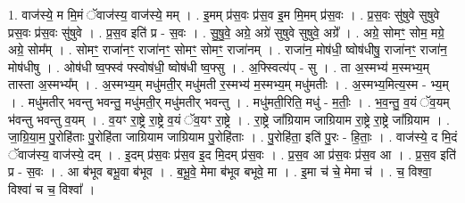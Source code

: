 \documentclass[17pt]{extarticle}
\begin{document}
1. वाज॑स्ये॒ म मि॒मं ॅवाज॑स्य॒ वाज॑स्ये॒ मम् । . इ॒मम् प्र॑स॒वः प्र॑स॒व इ॒म मि॒मम् प्र॑स॒वः । . प्र॒स॒वः सु॑षुवे सुषुवे प्रस॒वः प्र॑स॒वः सु॑षुवे । . प्र॒स॒व इति॑ प्र - स॒वः । . सु॒षु॒वे॒ अग्रे॒ अग्रे॑ सुषुवे सुषुवे॒ अग्रे᳚ । . अग्रे॒ सोमꣳ॒॒ सोम॒ मग्रे॒ अग्रे॒ सोम᳚म् । . सोमꣳ॒॒ राजा॑नꣳ॒॒ राजा॑नꣳ॒॒ सोमꣳ॒॒ सोमꣳ॒॒ राजा॑नम् । . राजा॑न॒ मोष॑धी॒ ष्वोष॑धीषु॒ राजा॑नꣳ॒॒ राजा॑न॒ मोष॑धीषु । . ओष॑धी ष्व॒फ्स्व॑ फ्स्वोष॑धी॒ ष्वोष॑धी ष्व॒फ्सु । . अ॒फ्स्वित्य॑प् - सु । . ता अ॒स्मभ्य॑ म॒स्मभ्य॒म् तास्ता अ॒स्मभ्य᳚म् । . अ॒स्मभ्य॒म् मधु॑मती॒र् मधु॑मती र॒स्मभ्य॑ म॒स्मभ्य॒म् मधु॑मतीः । . अ॒स्मभ्य॒मित्य॒स्म - भ्य॒म् । . मधु॑मतीर् भवन्तु भवन्तु॒ मधु॑मती॒र् मधु॑मतीर् भवन्तु । . मधु॑मती॒रिति॒ मधु॑ - म॒तीः॒ । . भ॒व॒न्तु॒ व॒यं ॅव॒यम् भ॑वन्तु भवन्तु व॒यम् । . व॒यꣳ रा॒ष्ट्रे रा॒ष्ट्रे व॒यं ॅव॒यꣳ रा॒ष्ट्रे । . रा॒ष्ट्रे जा᳚ग्रियाम जाग्रियाम रा॒ष्ट्रे रा॒ष्ट्रे जा᳚ग्रियाम । . जा॒ग्रि॒या॒म॒ पु॒रोहि॑ताः पु॒रोहि॑ता जाग्रियाम जाग्रियाम पु॒रोहि॑ताः । . पु॒रोहि॑ता॒ इति॑ पु॒रः - हि॒ताः॒ । . वाज॑स्ये॒ द मि॒दं ॅवाज॑स्य॒ वाज॑स्ये॒ दम् । . इ॒दम् प्र॑स॒वः प्र॑स॒व इ॒द मि॒दम् प्र॑स॒वः । . प्र॒स॒व आ प्र॑स॒वः प्र॑स॒व आ । . प्र॒स॒व इति॑ प्र - स॒वः । . आ ब॑भूव बभू॒वा ब॑भूव । . ब॒भू॒वे॒ मेमा ब॑भूव बभूवे॒ मा । . इ॒मा च॑ चे॒ मेमा च॑ । . च॒ विश्वा॒ विश्वा॑ च च॒ विश्वा᳚ । \newline
\end{document}
